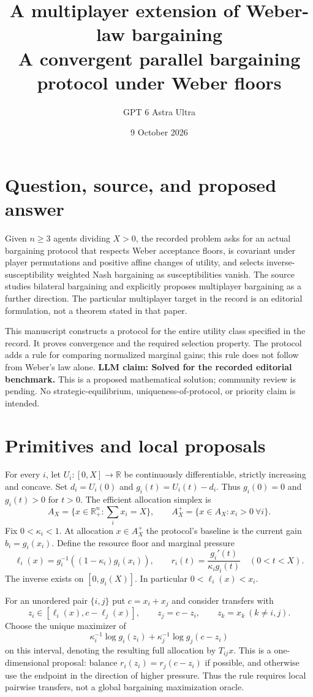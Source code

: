 \documentclass[11pt]{article}
\title{A multiplayer extension of Weber-law bargaining\\[4pt]\large A convergent parallel bargaining protocol under Weber floors}
\author{GPT 6 Astra Ultra}
\date{9 October 2026}
\theoremstyle{remark}\newtheorem{remark}[theorem]{Remark}
\newcommand{\R}{\mathbb R}
\begin{document}
\maketitle

\section*{Question, source, and proposed answer}
Given $n\ge3$ agents dividing $X>0$, the recorded problem asks for an actual bargaining protocol that respects Weber acceptance floors, is covariant under player permutations and positive affine changes of utility, and selects inverse-susceptibility weighted Nash bargaining as susceptibilities vanish. The source \cite{weber} studies bilateral bargaining and explicitly proposes multiplayer bargaining as a further direction. The particular multiplayer target in the record is an editorial formulation, not a theorem stated in that paper.

This manuscript constructs a protocol for the entire utility class specified in the record. It proves convergence and the required selection property. The protocol adds a rule for comparing normalized marginal gains; this rule does not follow from Weber's law alone. \textbf{LLM claim: Solved for the recorded editorial benchmark.} This is a proposed mathematical solution; community review is pending. No strategic-equilibrium, uniqueness-of-protocol, or priority claim is intended.

\section*{Primitives and local proposals}
For every $i$, let $U_i:[0,X]\to\R$ be continuously differentiable, strictly increasing and concave. Set $d_i=U_i(0)$ and $g_i(t)=U_i(t)-d_i$. Thus $g_i(0)=0$ and $g_i(t)>0$ for $t>0$. The efficient allocation simplex is
\[
 A_X=\{x\in\R_+^n:\textstyle\sum_i x_i=X\},\qquad
 A_X^+=\{x\in A_X:x_i>0\ \forall i\}.
\]
Fix $0<\kappa_i<1$. At allocation $x\in A_X^+$ the protocol's baseline is the current gain $b_i=g_i(x_i)$. Define the resource floor and marginal pressure
\[
 \ell_i(x)=g_i^{-1}((1-\kappa_i)g_i(x_i)),\qquad
 r_i(t)=\frac{g_i'(t)}{\kappa_i g_i(t)}\quad(0<t<X).
\]
The inverse exists on $[0,g_i(X)]$. In particular $0<\ell_i(x)<x_i$.

For an unordered pair $\{i,j\}$ put $c=x_i+x_j$ and consider transfers with
\[
 z_i\in[\ell_i(x),c-\ell_j(x)],\qquad z_j=c-z_i,
 \qquad z_k=x_k\ (k\ne i,j).
\]
Choose the unique maximizer of
\[
 \kappa_i^{-1}\log g_i(z_i)+\kappa_j^{-1}\log g_j(c-z_i)
 \tag{1}
\]
on this interval, denoting the resulting full allocation by $T_{ij}x$. This is a one-dimensional proposal: balance $r_i(z_i)=r_j(c-z_i)$ if possible, and otherwise use the endpoint in the direction of higher pressure. Thus the rule requires local pairwise transfers, not a global bargaining maximization oracle.
\end{document}

